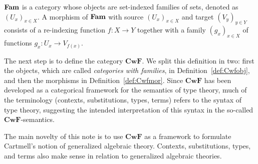 \documentclass{lmcs}
\def\Cwf{\mathbf{CwF}}
\begin{document}

\begin{definition}\label{def:catFam}
$\textbf{Fam}$ is a category whose objects are
set-indexed families of sets, denoted as $(U_x)_{x\in X}$.
A morphism of $\textbf{Fam}$ with source $(U_x)_{x\in X}$ and target $(V_y)_{y\in Y}$
consists of a re-indexing function $f: X\to Y$ together with a family
$(g_x)_{x\in X}$ of functions $g_x : U_x \to V_{f(x)}$. %
\end{definition}

The next step is to define the category $\Cwf$.
We split this definition in two: first the objects,
which are called \emph{categories with families}, in Definition~\ref{def:Cwfobj},
and then the morphisms in Definition~\ref{def:Cwfmor}.
Since $\Cwf$ has been developed as a categorical framework for the semantics of
type theory, much of the terminology (contexts, substitutions,
types, terms) refers to the syntax of type theory,
suggesting the intended interpretation of this syntax in the
so-called $\Cwf$-semantics.

The main novelty of this note is to use $\Cwf$ as a framework
to formulate Cartmell's notion of generalized algebraic theory.
Contexts, substitutions, types, and terms also make
sense in relation to generalized algebraic theories.
\end{document}
